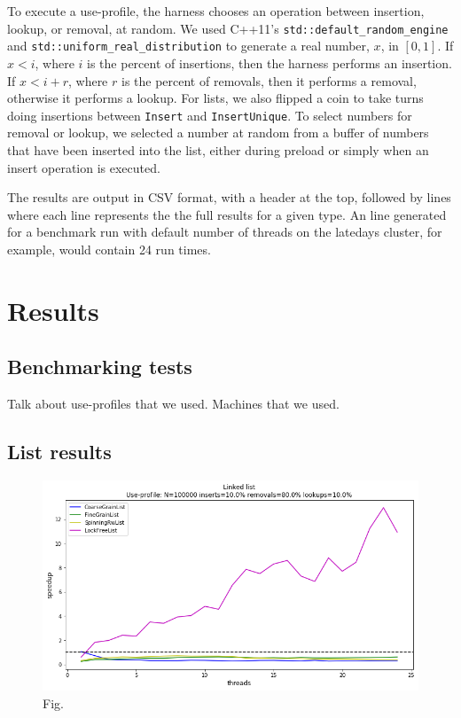 \documentclass[11pt]{article}
\begin{document}
To execute a use-profile, the harness chooses an operation between insertion,
lookup, or removal, at random. We used C++11's {\tt std::default\_random\_engine}
and {\tt std::uniform\_real\_distribution} to generate a real number, $x$, in
$[0,1]$. If $x < i$, where $i$ is the percent of insertions, then the harness
performs an insertion. If $x < i + r$, where $r$ is the percent of removals,
then it performs a removal, otherwise it performs a lookup. For lists, we also
flipped a coin to take turns doing insertions between {\tt Insert} and
{\tt InsertUnique}. To select numbers for removal or lookup, we selected a
number at random from a buffer of numbers that have been inserted into the list,
either during preload or simply when an insert operation is executed.

The results are output in CSV format, with a header at the top, followed by
lines where each line represents the the full results for a given type. An line
generated for a benchmark run with default number of threads on the latedays
cluster, for example, would contain 24 run times.

\section{Results}

\subsection{Benchmarking tests}
Talk about use-profiles that we used. Machines that we used.

\subsection{List results}


\begin{figure}[h]
\centering
\includegraphics[width=1.0\linewidth]{figs/lateday/combined/lateday_combined_list_insert_10_lookup_10_removal_80}
\caption{Fig.}
\label{fig:fig1}
\end{figure}
\end{document}
